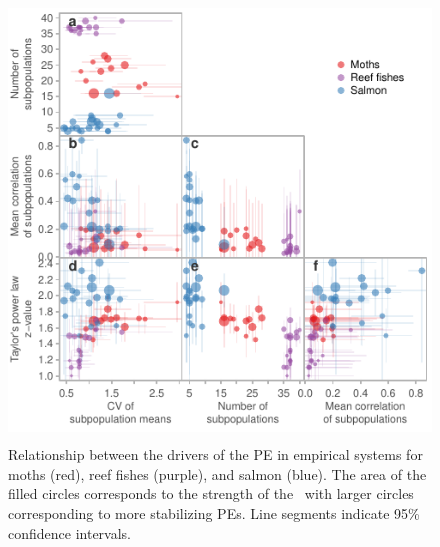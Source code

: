 \begin{figure}[htbp]
  \centering
  \includegraphics[height=4.6in]{prophets/bias_factors_cross_correlation.pdf}
  \caption{Relationship between the drivers of the PE in empirical systems for
    moths (red), reef fishes (purple), and salmon (blue).  The area of the
    filled circles corresponds to the strength of the \tilmanPE\ with larger
    circles corresponding to more stabilizing PEs.  Line segments indicate
    95\% confidence intervals.}
  \label{fig:factors-cor}
\end{figure}

